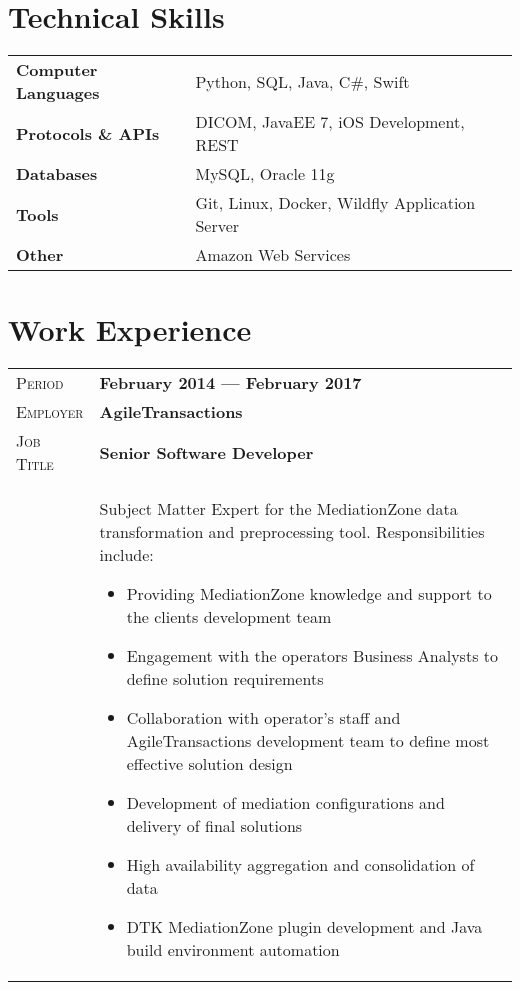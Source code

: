 \documentclass[letter, oneside, final]{scrartcl} %
\newcommand{\gray}{\rowcolor[gray]{.90}} %
\begin{document}
\begin{center}
\section{Technical Skills}

\begin{tabular}{ @{} >{\bfseries}l @{\hspace{6ex}} l }
Computer Languages & Python, SQL, Java, C\#, Swift \\
Protocols \& APIs & DICOM, JavaEE 7, iOS Development, REST\\
Databases & MySQL, Oracle 11g \\
Tools & Git, Linux, Docker, Wildfly Application Server \\
Other & Amazon Web Services
\end{tabular}


\section{Work Experience}

\begin{tabularx}{0.97\linewidth}{>{\raggedleft\scshape}p{2cm}X}
	\gray Period & \textbf{February 2014 --- February 2017}\\
	\gray Employer & \textbf{AgileTransactions}\\
	\gray Job Title & \textbf{Senior Software Developer}\\
	& Subject Matter Expert for the MediationZone data transformation and preprocessing tool. Responsibilities include: 
	\begin{itemize}
		\item Providing MediationZone knowledge and support to the clients development team
		\item Engagement with the operators Business Analysts to define solution requirements
		\item Collaboration with operator’s staff and AgileTransactions development team to define most effective solution design
		\item Development of mediation configurations and delivery of final solutions
		\item High availability aggregation and consolidation of data
		\item DTK MediationZone plugin development and Java build environment automation
	\end{itemize}
\end{tabularx}


\end{center}
\end{document}
